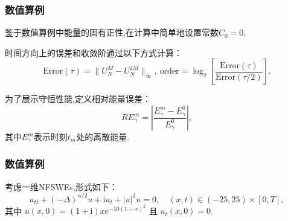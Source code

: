 \documentclass[aspectratio=169]{beamer}
\numberwithin{theorem}{section} %
\begin{document}
\begin{frame}\frametitle{数值算例}
	鉴于数值算例中能量的固有正性,在计算中简单地设置常数$C_0=0$.

	时间方向上的误差和收敛阶通过以下方式计算：
	\begin{equation}
		\text{Error}(\tau) = \|U_{N}^{M} - U_{N}^{2 M}\|_{\infty},~\text{order} = \log_{2}\left[\frac{\text{Error}(\tau)}{\text{Error}(\tau / 2)}\right].\label{eq_SAVRRK:104}
	\end{equation}
	
	为了展示守恒性能,定义相对能量误差：
	\begin{equation}\label{eq_SAVRRK:105}
		R E_{\gamma}^{m} = \left|\frac{E_{\gamma}^{m} - E_{\gamma}^{0}}{E_{\gamma}^{0}}\right|,
	\end{equation}
	其中$E_{\gamma}^{m}$表示时刻$t_m$处的离散能量.
\end{frame}
\begin{frame}\frametitle{数值算例}
		\begin{example}\label{exp_SAVRRK:1}
			考虑一维NFSWEs,形式如下\cite{ranLinearlyImplicitConservative2016}：
			\begin{equation}\label{eq_SAVRRK:108}
				u_{t t}+(-\Delta)^{\alpha / 2} u+\mathrm{i}u_t+|u|^2 u=0, \quad (x,t)\in  (-25, 25)\times[0, T],
			\end{equation}
			其中 $u(x, 0)=(1+\mathrm{i}) x e^{-10(1-x)^2}$ 且 $u_t(x, 0)=0$.
			\end{example}	
\end{frame}
\end{document}
